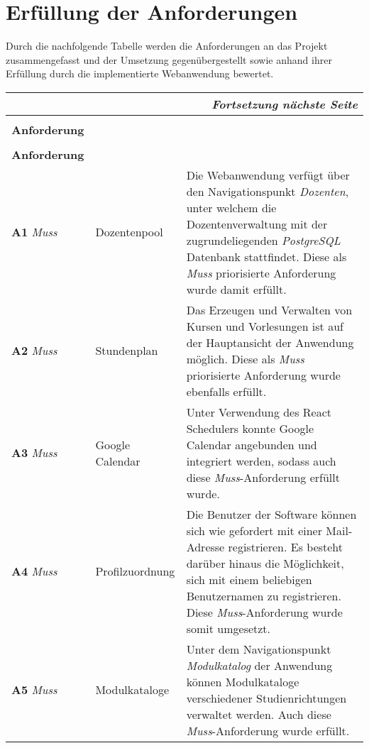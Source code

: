\section{Erfüllung der Anforderungen}
Durch die nachfolgende Tabelle werden die Anforderungen an das Projekt zusammengefasst
und der Umsetzung gegenübergestellt sowie anhand ihrer Erfüllung durch die implementierte Webanwendung bewertet.

\begin{longtable}[H]{|p{}|p{}|p{}|}		
	\multicolumn{3}{|r|}{\textit{Fortsetzung nächste Seite}} \\ \hline
	\endfoot
	\endlastfoot
	\hline &&\\[-0.5em]
	\textbf{Anforderung} & \head{Kurztitel} & \head{Umsetzung} \\ \hline
	\endfirsthead
	\hline &&\\[-0.5em]
	\textbf{Anforderung} & \head{Kurztitel} & \head{Umsetzung} \\ \hline
	\endhead
	\parbox[t]{3cm}{\textbf{A1}} \newline \textit{Muss} & Dozentenpool & Die Webanwendung verfügt über den Navigationspunkt \textit{Dozenten}, unter welchem die Dozentenverwaltung mit der zugrundeliegenden \textit{PostgreSQL} Datenbank stattfindet. Diese als \textit{Muss} priorisierte Anforderung wurde damit erfüllt.\\ \hline %
	\parbox[t]{3cm}{\textbf{A2}} \newline \textit{Muss} & Stundenplan &  Das Erzeugen und Verwalten von Kursen und Vorlesungen ist auf der Hauptansicht der Anwendung möglich. Diese als \textit{Muss} priorisierte Anforderung wurde ebenfalls erfüllt.\\ \hline  %
	\parbox[t]{3cm}{\textbf{A3}} \newline \textit{Muss} & Google Calendar & Unter Verwendung des React Schedulers konnte Google Calendar angebunden und integriert werden, sodass auch diese \textit{Muss}-Anforderung erfüllt wurde. \\ \hline %
	\parbox[t]{3cm}	{\textbf{A4}} \newline \textit{Muss} & Profilzuordnung & Die Benutzer der Software können sich wie gefordert mit einer Mail-Adresse registrieren. Es besteht darüber hinaus die Möglichkeit, sich mit einem beliebigen Benutzernamen zu registrieren. Diese \textit{Muss}-Anforderung wurde somit umgesetzt.\\ \hline %
	\parbox[t]{3cm}	{\textbf{A5}} \newline \textit{Muss} & Modulkataloge & Unter dem Navigationspunkt \textit{Modulkatalog} der Anwendung können Modulkataloge verschiedener Studienrichtungen verwaltet werden. Auch diese \textit{Muss}-Anforderung wurde erfüllt.\\ \hline %

\end{longtable}
